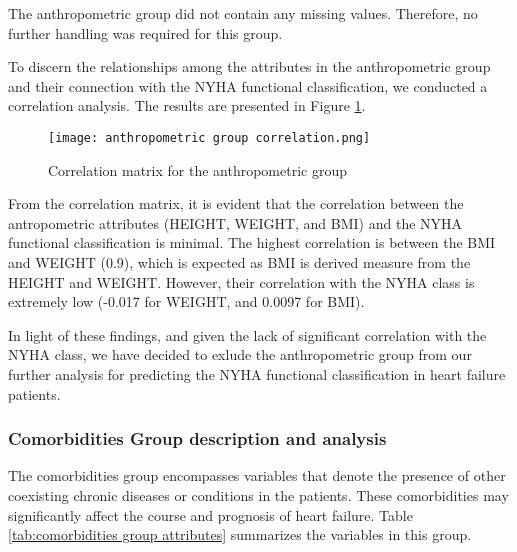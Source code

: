         The anthropometric group did not contain any missing values. Therefore, no further handling was required for this group. 

        To discern the relationships among the attributes in the anthropometric group and their connection with the NYHA functional classification, we conducted a correlation analysis. The results are presented in Figure \ref{fig:anthropometric group correlation}.

        \begin{figure}[H]
          \centering
          \texttt{[image: anthropometric group correlation.png]}
          \caption{Correlation matrix for the anthropometric group}
          \label{fig:anthropometric group correlation}
        \end{figure}

        From the correlation matrix, it is evident that the correlation between the antropometric attributes (HEIGHT, WEIGHT, and BMI) and the NYHA functional classification is minimal. The highest correlation is between the BMI and WEIGHT (0.9), which is expected as BMI is derived measure from the HEIGHT and WEIGHT. However, their correlation with the NYHA class is extremely low (-0.017 for WEIGHT, and 0.0097 for BMI).

        In light of these findings, and given the lack of significant correlation with the NYHA class, we have decided to exlude the anthropometric group from our further analysis for predicting the NYHA functional classification in heart failure patients.

    
\subsubsection{Comorbidities Group description and analysis}
        The comorbidities group encompasses variables that denote the presence of other coexisting chronic diseases or conditions in the patients. These comorbidities may significantly affect the course and prognosis of heart failure. Table \ref{tab:comorbidities group attributes} summarizes the variables in this group.

